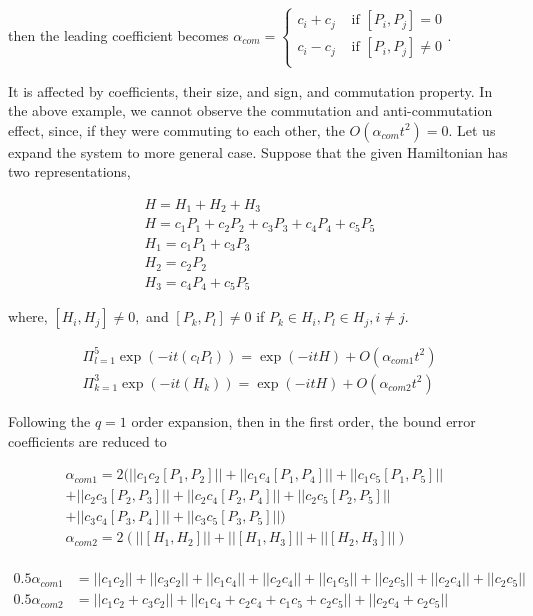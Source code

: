 \documentclass[a4paper,12pt]{article}
\begin{document}
then the leading coefficient becomes $\alpha_{com} = \begin{cases}
    c_i + c_j & \mbox{ if } [P_i, P_j] = 0 \\
    c_i - c_j & \mbox{ if } [P_i, P_j] \neq 0 \\
\end{cases}$.

It is affected by coefficients, their size, and sign, and commutation property.
In the above example, we cannot observe the commutation and anti-commutation
effect, since, if they were commuting to each other, the $O(\alpha_{com} t^2) = 0$.
Let us expand the system to more general case.
Suppose that the given Hamiltonian has two representations,

\begin{align}
    H = H_1 + H_2 + H_3  \\
    H =  c_1 P_1 + c_2 P_2 + c_3 P_3 + c_4 P_4 + c_5 P_5\\
    H_1 = c_1 P_1 + c_3 P_3 \\
    H_2 = c_2 P_2\\
    H_3 = c_4 P_4 + c_5 P_5
\end{align}

where, $[H_i, H_j] \neq 0,$ and 
$[P_k, P_l] \neq 0$ if $P_k \in H_i, P_l \in H_j, i \neq j$.

\begin{align}
    \Pi_{l=1}^5 \exp(- i t (c_l P_l)) = \exp(-it H) + O(\alpha_{com 1} t^2)\label{eq:pauli_evolve}\\
    \Pi_{k=1}^3 \exp(- i t (H_k)) = \exp(-it H) + O(\alpha_{com 2} t^2) \label{eq:evolve_commute}
\end{align}


Following the $q=1$ order expansion, then in the first order, the bound error 
coefficients are reduced to 

\begin{align}
    \alpha_{com1} = 2(|| c_1 c_2 [P_1, P_2]|| + || c_1 c_4 [P_1, P_4]|| + || c_1 c_5 [P_1, P_5]||& \\
    + || c_2 c_3 [P_2, P_3]|| + || c_2 c_4 [P_2, P_4]|| + || c_2 c_5 [P_2, P_5]||& \\
    + || c_3 c_4 [P_3, P_4]|| + || c_3 c_5 [P_3, P_5]||)&\\
    \alpha_{com2} = 2(|| [H_1, H_2]|| + || [H_1, H_3]|| + || [H_2, H_3]||)& \\
\end{align}


\begin{align}
    0.5 \alpha_{com1} &= ||c_1 c_2|| + ||c_3 c_2|| + ||c_1 c_4|| + ||c_2 c_4|| + ||c_1 c_5|| + ||c_2 c_5||  + ||c_2 c_4|| + ||c_2 c_5||\\
    0.5 \alpha_{com2} &= ||c_1 c_2 + c_3 c_2|| + ||c_1 c_4 + c_2 c_4 + c_1 c_5 + c_2 c_5||  + ||c_2 c_4 + c_2 c_5||
\end{align}
\end{document}
